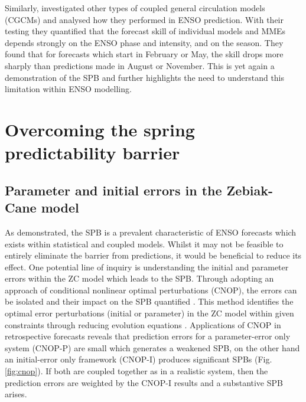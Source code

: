 \documentclass[12pt, onecolumn]{revtex4}    %
\begin{document}
Similarly, \cite{jin2008current} investigated other types of coupled general circulation models (CGCMs) and analysed how they performed in ENSO prediction. With their testing they quantified that the forecast skill of individual models and MMEs depends strongly on the ENSO phase and intensity, and on the season. They found that for forecasts which start in February or May, the skill drops more sharply than predictions made in August or November. This is yet again a demonstration of the SPB and further highlights the need to understand this limitation within ENSO modelling.

\section{Overcoming the spring predictability barrier}

\subsection{Parameter and initial errors in the Zebiak-Cane model}

As demonstrated, the SPB is a prevalent characteristic of ENSO forecasts which exists within statistical and coupled models. Whilst it may not be feasible to entirely eliminate the barrier from predictions, it would be beneficial to reduce its effect. One potential line of inquiry is understanding the initial and parameter errors within the ZC model which leads to the SPB. Through adopting an approach of conditional nonlinear optimal perturbations (CNOP), the errors can be isolated and their impact on the SPB quantified \citep{duan2009exploring}. This method identifies the optimal error perturbations (initial or parameter) in the ZC model within given constraints through reducing evolution equations \citep{mu2010extension}. Applications of CNOP in retrospective forecasts reveals that prediction errors for a parameter-error only system (CNOP-P) are small which generates a weakened SPB, on the other hand an initial-error only framework (CNOP-I) produces significant SPBs (Fig. \ref{fig:cnop}). If both are coupled together as in a realistic system, then the prediction errors are weighted by the CNOP-I results and a substantive SPB arises. \\
\end{document}
